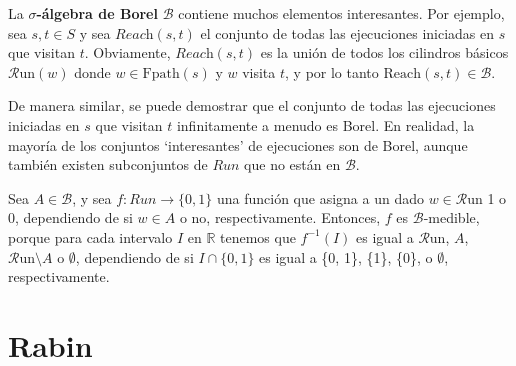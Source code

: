 La \textbf{\(\sigma\)-álgebra de Borel} \( \mathcal{B} \) contiene muchos
elementos interesantes. Por ejemplo, sea \( s, t \in S \) y sea \(
\textit{Reach}(s, t) \) el conjunto de todas las ejecuciones iniciadas en \( s
\) que visitan \( t \). Obviamente, \( \textit{Reach}(s, t) \) es la unión de
todos los cilindros básicos \( \mathcal{R}\text{un}(w) \) donde \( w \in
\text{Fpath}(s) \) y \( w \) visita \( t \), y por lo tanto \( \text{Reach}(s,
t) \in \mathcal{B} \).

De manera similar, se puede demostrar que el conjunto de todas las ejecuciones
iniciadas en \( s \) que visitan \( t \) infinitamente a menudo es Borel. En
realidad, la mayoría de los conjuntos `interesantes' de ejecuciones son de
Borel, aunque también existen subconjuntos de \(\textit{Run}\) que no están en
\(\mathcal{B}\).

Sea \( A \in \mathcal{B} \), y sea \( f : \textit{Run} \rightarrow \{0, 1\} \)
una función que asigna a un dado \( w \in \mathcal{R}\text{un} \) 1 o 0,
dependiendo de si \( w \in A \) o no, respectivamente. Entonces, \( f \) es
\(\mathcal{B}\)-medible, porque para cada intervalo \( I \) en \( \mathbb{R} \)
tenemos que \( f^{-1}(I) \) es igual a \(\mathcal{R}\text{un}\), \( A \),
\(\mathcal{R}\text{un} \setminus A \) o \( \emptyset \), dependiendo de si \( I
\cap \{0, 1\} \) es igual a \{0, 1\}, \{1\}, \{0\}, o \(\emptyset\),
respectivamente.

\section{Rabin}

